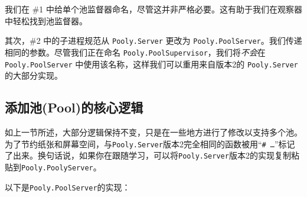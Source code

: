 我们在 \#1
中给单个池监督器命名，尽管这并非严格必要。这有助于我们在观察器中轻松找到池监督器。

其次，\#2 中的子进程规范从 \texttt{Pooly.Server} 更改为
\texttt{Pooly.PoolServer}。我们传递相同的参数。尽管我们正在命名
\texttt{Pooly.PoolSupervisor}，我们将\emph{不会}在
\texttt{Pooly.PoolServer}
中使用该名称，这样我们可以重用来自版本2的
\texttt{Pooly.Server} 的大部分实现。


\subsection{添加池(Pool)的核心逻辑}

如上一节所述，大部分逻辑保持不变，只是在一些地方进行了修改以支持多个池。为了节约纸张和屏幕空间，与\texttt{Pooly.Server}版本2完全相同的函数被用``\texttt{\# …}''标记了出来。换句话说，如果你在跟随学习，可以将\texttt{Pooly.Server}版本2的实现复制粘贴到\texttt{Pooly.PoolyServer}。

以下是\texttt{Pooly.PoolServer}的实现：




